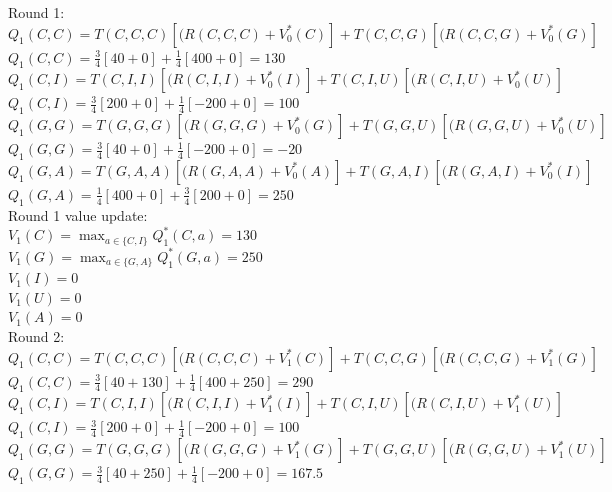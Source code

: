 \documentclass[12pt]{article}
\begin{document}
\noindent
Round 1: \\
\noindent
$Q_1(C,C) = T(C,C,C)[(R(C,C,C)+V_0^*(C)]+T(C,C,G)[(R(C,C,G)+V_0^*(G)]$ \\
$Q_1(C,C) = \frac{3}{4} [40 + 0] + \frac{1}{4} [400 + 0] = 130$ \\

\noindent
$Q_1(C,I) = T(C,I,I)[(R(C,I,I)+V_0^*(I)]+T(C,I,U)[(R(C,I,U)+V_0^*(U)]$ \\
$Q_1(C,I) = \frac{3}{4} [200 + 0] + \frac{1}{4} [-200 + 0] = 100$ \\

\noindent
$Q_1(G,G) = T(G,G,G)[(R(G,G,G)+V_0^*(G)]+T(G,G,U)[(R(G,G,U)+V_0^*(U)]$ \\
$Q_1(G,G) = \frac{3}{4} [40 + 0] + \frac{1}{4} [-200 + 0] = -20$ \\

\noindent
$Q_1(G,A) = T(G,A,A)[(R(G,A,A)+V_0^*(A)]+T(G,A,I)[(R(G,A,I)+V_0^*(I)]$ \\
$Q_1(G,A) = \frac{1}{4} [400 + 0] + \frac{3}{4} [200 + 0] = 250$ \\

\noindent
Round 1 value update: \\
$V_1(C) = \max_{a \in \{C, I\}} Q_1^*(C,a) = 130$ \\
$V_1(G) = \max_{a \in \{G, A\}} Q_1^*(G,a) = 250$ \\ 
$V_1(I) = 0$ \\ 
$V_1(U) = 0$ \\ 
$V_1(A) = 0$ \\ 





\noindent
Round 2: \\
\noindent
$Q_1(C,C) = T(C,C,C)[(R(C,C,C)+V_1^*(C)]+T(C,C,G)[(R(C,C,G)+V_1^*(G)]$ \\
$Q_1(C,C) = \frac{3}{4} [40 + 130] + \frac{1}{4} [400 + 250] = 290$ \\

\noindent
$Q_1(C,I) = T(C,I,I)[(R(C,I,I)+V_1^*(I)]+T(C,I,U)[(R(C,I,U)+V_1^*(U)]$ \\
$Q_1(C,I) = \frac{3}{4} [200 + 0] + \frac{1}{4} [-200 + 0] = 100$ \\

\noindent
$Q_1(G,G) = T(G,G,G)[(R(G,G,G)+V_1^*(G)]+T(G,G,U)[(R(G,G,U)+V_1^*(U)]$ \\
$Q_1(G,G) = \frac{3}{4} [40 + 250] + \frac{1}{4} [-200 + 0] = 167.5$ \\
\end{document}

